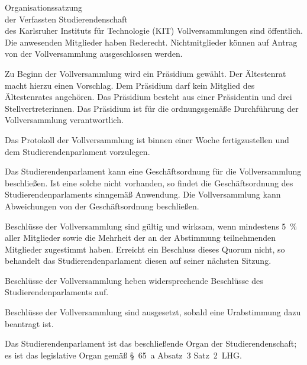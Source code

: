 \begin{jurdoc}[Organisationssatzung]{Organisationssatzung\\der Verfassten Studierendenschaft\\des Karlsruher Instituts für Technologie (KIT)}
Vollversammlungen sind öffentlich. Die anwesenden Mitglieder haben Rederecht. Nichtmitglieder können auf Antrag von der Vollversammlung ausgeschlossen werden.

Zu Beginn der Vollversammlung wird ein Präsidium gewählt. Der Ältestenrat macht hierzu einen Vorschlag. Dem Präsidium darf kein Mitglied des Ältestenrates angehören. Das Präsidium besteht aus einer Präsidentin und drei Stellvertreterinnen. Das Präsidium ist für die ordnungsgemäße Durchführung der Vollversammlung verantwortlich.

Das Protokoll der Vollversammlung ist binnen einer Woche fertigzustellen und dem Studierendenparlament vorzulegen.

Das Studierendenparlament kann eine Geschäftsordnung für die Vollversammlung beschließen. Ist eine solche nicht vorhanden, so findet die Ge\-schäfts\-ord\-nung des Studierendenparlaments sinngemäß Anwendung. Die Vollversammlung kann Abweichungen von der Geschäftsordnung beschließen.




Beschlüsse der Vollversammlung sind gültig und wirksam, wenn mindestens 5~\% aller Mitglieder sowie die Mehrheit der an der Abstimmung teilnehmenden Mitglieder zugestimmt haben. Erreicht ein Beschluss dieses Quorum nicht, so behandelt das Studierendenparlament diesen auf seiner nächsten Sitzung.

Beschlüsse der Vollversammlung heben widersprechende Beschlüsse des Studierendenparlaments auf.

Beschlüsse der Vollversammlung sind ausgesetzt, sobald eine Urabstimmung dazu beantragt ist.


%
%


Das Studierendenparlament ist das beschließende Organ der Studierendenschaft; es ist das legislative Organ gemäß §~65~a Absatz~3 Satz~2~LHG.


\end{jurdoc}
